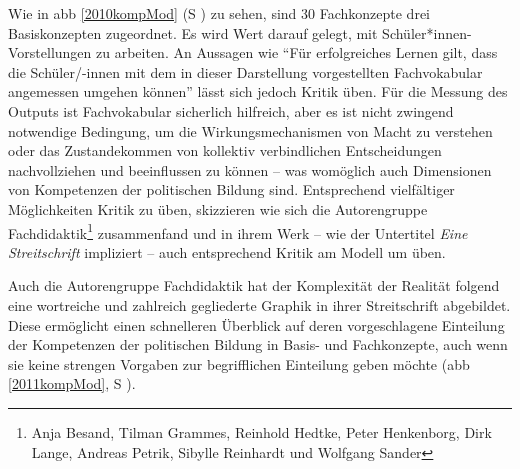 Wie in \gls{abb} \ref{2010kompMod} (\gls{S} \pageref{2010kompMod}) zu sehen, sind 30 Fachkonzepte drei Basiskonzepten zugeordnet. Es wird Wert darauf gelegt, mit Schüler*innen-Vorstellungen zu arbeiten. %
An Aussagen wie \enquote{Für erfolgreiches Lernen gilt, dass die Schüler/-innen mit dem in dieser Darstellung vorgestellten Fachvokabular angemessen umgehen können} \autocite[13]{weißeno.2010} lässt sich jedoch Kritik üben. Für die Messung des Outputs ist Fachvokabular sicherlich hilfreich, aber es ist nicht zwingend notwendige Bedingung, um die Wirkungsmechanismen von Macht zu verstehen oder das Zustandekommen von kollektiv verbindlichen Entscheidungen nachvollziehen und beeinflussen zu können -- was womöglich auch Dimensionen von Kompetenzen der politischen Bildung sind. Entsprechend vielfältiger Möglichkeiten Kritik zu üben, skizzieren \textcite[108-109]{Gloe2020} wie sich die Autorengruppe Fachdidaktik\footnote{
    Anja Besand, Tilman Grammes, Reinhold Hedtke, Peter Henkenborg, Dirk Lange, Andreas Petrik, Sibylle Reinhardt und Wolfgang Sander} 
zusammenfand und in ihrem Werk  -- wie der Untertitel \emph{Eine Streitschrift} impliziert -- auch entsprechend Kritik am Modell um \citeauthor{weißeno.2010} üben. 

Auch die Autorengruppe Fachdidaktik hat der Komplexität der Realität folgend eine wortreiche und zahlreich gegliederte Graphik in ihrer Streitschrift abgebildet. Diese ermöglicht einen schnelleren Überblick auf deren vorgeschlagene Einteilung der Kompetenzen der politischen Bildung in Basis- und Fachkonzepte, auch wenn sie keine strengen Vorgaben zur begrifflichen Einteilung geben möchte (\gls{abb} \ref{2011kompMod}, \gls{S} \pageref{2011kompMod}).

